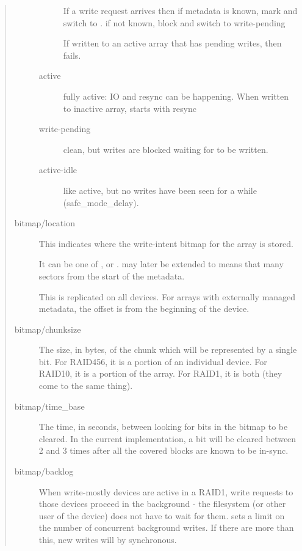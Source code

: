 \documentclass[a4paper,8pt,english]{sphinxmanual}
\begin{document}
\begin{quote}
\begin{description}
\begin{description}
If a write request arrives then
if metadata is known, mark  and switch to .
if not known, block and switch to write-pending

If written to an active array that has pending writes, then fails.

\item[{active}] \leavevmode
fully active: IO and resync can be happening.
When written to inactive array, starts with resync

\item[{write-pending}] \leavevmode
clean, but writes are blocked waiting for  to be written.

\item[{active-idle}] \leavevmode
like active, but no writes have been seen for a while (safe\_mode\_delay).

\end{description}

\item[{bitmap/location}] \leavevmode
This indicates where the write-intent bitmap for the array is
stored.

It can be one of ,  or .
 may later be extended to 
 means that many sectors from the start of the metadata.

This is replicated on all devices.  For arrays with externally
managed metadata, the offset is from the beginning of the
device.

\item[{bitmap/chunksize}] \leavevmode
The size, in bytes, of the chunk which will be represented by a
single bit.  For RAID456, it is a portion of an individual
device. For RAID10, it is a portion of the array.  For RAID1, it
is both (they come to the same thing).

\item[{bitmap/time\_base}] \leavevmode
The time, in seconds, between looking for bits in the bitmap to
be cleared. In the current implementation, a bit will be cleared
between 2 and 3 times  after all the covered blocks
are known to be in-sync.

\item[{bitmap/backlog}] \leavevmode
When write-mostly devices are active in a RAID1, write requests
to those devices proceed in the background - the filesystem (or
other user of the device) does not have to wait for them.
 sets a limit on the number of concurrent background
writes.  If there are more than this, new writes will by
synchronous.


\end{description}
\end{quote}
\end{document}
